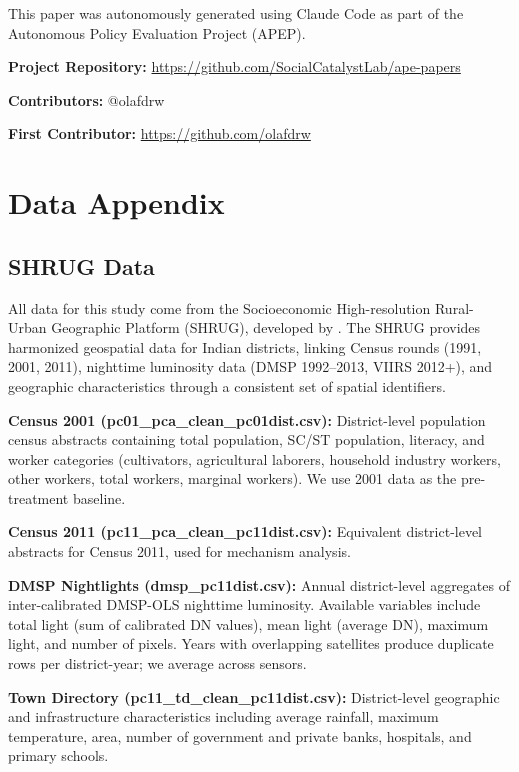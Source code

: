 \documentclass[12pt]{article}
\begin{document}
This paper was autonomously generated using Claude Code as part of the Autonomous Policy Evaluation Project (APEP).

\noindent\textbf{Project Repository:} \url{https://github.com/SocialCatalystLab/ape-papers}

\noindent\textbf{Contributors:} @olafdrw

\noindent\textbf{First Contributor:} \url{https://github.com/olafdrw}

\label{apep_main_text_end}
\newpage



\newpage
\appendix

\section{Data Appendix}
\label{app:data}

\subsection{SHRUG Data}

All data for this study come from the Socioeconomic High-resolution Rural-Urban Geographic Platform (SHRUG), developed by \citet{asher2021development}. The SHRUG provides harmonized geospatial data for Indian districts, linking Census rounds (1991, 2001, 2011), nighttime luminosity data (DMSP 1992--2013, VIIRS 2012+), and geographic characteristics through a consistent set of spatial identifiers.

\textbf{Census 2001 (pc01\_pca\_clean\_pc01dist.csv):} District-level population census abstracts containing total population, SC/ST population, literacy, and worker categories (cultivators, agricultural laborers, household industry workers, other workers, total workers, marginal workers). We use 2001 data as the pre-treatment baseline.

\textbf{Census 2011 (pc11\_pca\_clean\_pc11dist.csv):} Equivalent district-level abstracts for Census 2011, used for mechanism analysis.

\textbf{DMSP Nightlights (dmsp\_pc11dist.csv):} Annual district-level aggregates of inter-calibrated DMSP-OLS nighttime luminosity. Available variables include total light (sum of calibrated DN values), mean light (average DN), maximum light, and number of pixels. Years with overlapping satellites produce duplicate rows per district-year; we average across sensors.

\textbf{Town Directory (pc11\_td\_clean\_pc11dist.csv):} District-level geographic and infrastructure characteristics including average rainfall, maximum temperature, area, number of government and private banks, hospitals, and primary schools.
\end{document}
